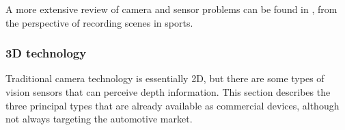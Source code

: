 A more extensive review of camera and sensor problems can be found in  
\cite{Pueo2016}, from the perspective of recording scenes in sports.
%
%    
%        
%    

\subsubsection{3D technology}
Traditional camera technology is essentially 2D, but there are some
types of vision sensors that can perceive depth information. This section
describes the three principal types that are already available as commercial
devices, although not always targeting the automotive market.

